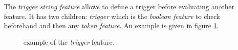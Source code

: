\documentclass[manual-fr.tex]{subfiles}
\begin{document}
The \emph{trigger} \textit{string feature} allows to define a trigger before evaluating another feature. It has two children: \textit{trigger} which is the \emph{boolean feature} to check beforehand and then any \textit{token feature}. An example is given in figure \ref{fig:feature-triggered}.

\begin{figure}[ht!]
\footnotesize
\begin{xml}
\end{xml}
\caption{example of the \textit{trigger} feature.}
\label{fig:feature-triggered}
\end{figure}
\end{document}
